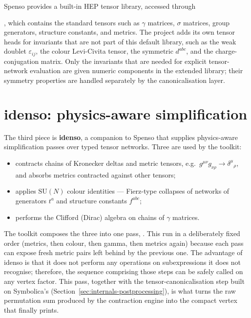 \begin{tcolorbox}[notebox, title={Custom invariants}]
Spenso provides a built-in HEP tensor library, accessed through

\noindent {}, which contains the standard tensors such as
\(\gamma\) matrices, \(\sigma\) matrices, group generators, structure constants,
and metrics. The project adds its own tensor heads for invariants that are not part of this default library, such as the weak doublet \(\varepsilon_{ij}\), the colour Levi-Civita tensor, the symmetric \(d^{abc}\), and the charge-conjugation matrix. Only the invariants that are needed for explicit tensor-network evaluation are given numeric components in the extended library; their symmetry properties are handled separately by the canonicalisation layer.
\end{tcolorbox}

\section{idenso: physics-aware simplification}
\label{sec:cas-idenso}

The third piece is \textbf{idenso}, a companion to Spenso that supplies physics-aware simplification passes over typed tensor networks. Three are used by the toolkit:

\begin{itemize}
    \item {} contracts chains of Kronecker deltas and metric tensors, e.g.\ $g^{\mu\nu} g_{\nu\rho} \to \delta^\mu{}_\rho$, and absorbs metrics contracted against other tensors;
    \item {} applies $\mathrm{SU}(N)$ colour identities --- Fierz-type collapses of networks of generators $t^a$ and structure constants $f^{abc}$;
    \item {} performs the Clifford (Dirac) algebra on chains of $\gamma$ matrices.
\end{itemize}

The toolkit composes the three into one pass, . This run in a deliberately fixed order (metrics, then colour, then gamma, then metrics again) because each pass can expose fresh metric pairs left behind by the previous one. The advantage of idenso is that it does not perform any operations on subexpressions it does not recognise; therefore, the sequence comprising those steps can be safely called on any vertex factor. This pass, together with the tensor-canonicalisation step built on Symbolica's  (Section~\ref{sec:internals-postprocessing}), is what turns the raw permutation sum produced by the contraction engine into the compact vertex that  finally prints.

